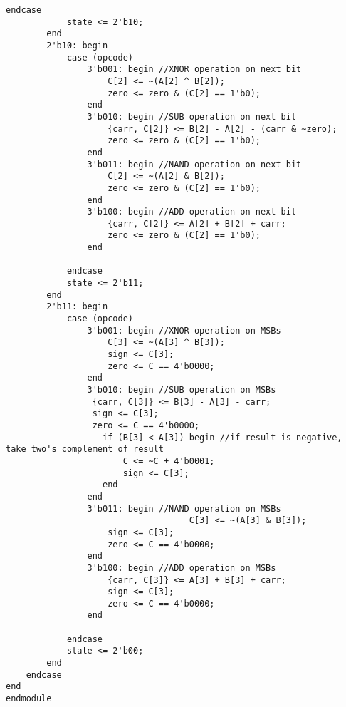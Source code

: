 \begin{lstlisting}[style=verilogStyle, caption={Verilog code for 4-bit ALU},label={lst:lstlisting}]
            endcase
            state <= 2'b10;
        end
        2'b10: begin
            case (opcode)
                3'b001: begin //XNOR operation on next bit
                    C[2] <= ~(A[2] ^ B[2]);
                    zero <= zero & (C[2] == 1'b0);
                end
                3'b010: begin //SUB operation on next bit
                    {carr, C[2]} <= B[2] - A[2] - (carr & ~zero);
					zero <= zero & (C[2] == 1'b0);
                end
                3'b011: begin //NAND operation on next bit
                    C[2] <= ~(A[2] & B[2]);
                    zero <= zero & (C[2] == 1'b0);
                end
                3'b100: begin //ADD operation on next bit
                    {carr, C[2]} <= A[2] + B[2] + carr;
                    zero <= zero & (C[2] == 1'b0);
                end

            endcase
            state <= 2'b11;
        end
        2'b11: begin
            case (opcode)
                3'b001: begin //XNOR operation on MSBs
                    C[3] <= ~(A[3] ^ B[3]);
                    sign <= C[3];
                    zero <= C == 4'b0000;
                end
                3'b010: begin //SUB operation on MSBs
                 {carr, C[3]} <= B[3] - A[3] - carr;
                 sign <= C[3];
                 zero <= C == 4'b0000;
                   if (B[3] < A[3]) begin //if result is negative, take two's complement of result
                       C <= ~C + 4'b0001;
                       sign <= C[3];
                   end
                end
                3'b011: begin //NAND operation on MSBs
                                    C[3] <= ~(A[3] & B[3]);
                    sign <= C[3];
                    zero <= C == 4'b0000;
                end
                3'b100: begin //ADD operation on MSBs
                    {carr, C[3]} <= A[3] + B[3] + carr;
                    sign <= C[3];
                    zero <= C == 4'b0000;
                end

            endcase
            state <= 2'b00;
        end
    endcase
end
endmodule
\end{lstlisting}
